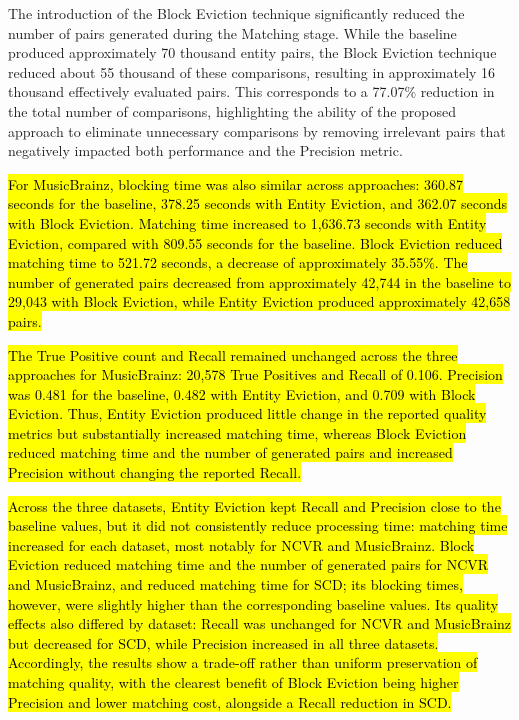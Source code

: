 \documentclass{ieeeaccess}
\begin{document}
The introduction of the Block Eviction technique significantly reduced the number of pairs generated during the Matching stage. While the baseline produced approximately 70 thousand entity pairs, the Block Eviction technique reduced about 55 thousand of these comparisons, resulting in approximately 16 thousand effectively evaluated pairs. This corresponds to a 77.07\% reduction in the total number of comparisons, highlighting the ability of the proposed approach to eliminate unnecessary comparisons by removing irrelevant pairs that negatively impacted both performance and the Precision metric.

\hl{For MusicBrainz, blocking time was also similar across approaches: 360.87 seconds for the baseline, 378.25 seconds with Entity Eviction, and 362.07 seconds with Block Eviction. Matching time increased to 1,636.73 seconds with Entity Eviction, compared with 809.55 seconds for the baseline. Block Eviction reduced matching time to 521.72 seconds, a decrease of approximately 35.55\%. The number of generated pairs decreased from approximately 42,744 in the baseline to 29,043 with Block Eviction, while Entity Eviction produced approximately 42,658 pairs.}

\hl{The True Positive count and Recall remained unchanged across the three approaches for MusicBrainz: 20,578 True Positives and Recall of 0.106. Precision was 0.481 for the baseline, 0.482 with Entity Eviction, and 0.709 with Block Eviction. Thus, Entity Eviction produced little change in the reported quality metrics but substantially increased matching time, whereas Block Eviction reduced matching time and the number of generated pairs and increased Precision without changing the reported Recall.}

\hl{Across the three datasets, Entity Eviction kept Recall and Precision close to the baseline values, but it did not consistently reduce processing time: matching time increased for each dataset, most notably for NCVR and MusicBrainz. Block Eviction reduced matching time and the number of generated pairs for NCVR and MusicBrainz, and reduced matching time for SCD; its blocking times, however, were slightly higher than the corresponding baseline values. Its quality effects also differed by dataset: Recall was unchanged for NCVR and MusicBrainz but decreased for SCD, while Precision increased in all three datasets. Accordingly, the results show a trade-off rather than uniform preservation of matching quality, with the clearest benefit of Block Eviction being higher Precision and lower matching cost, alongside a Recall reduction in SCD.}
\end{document}
